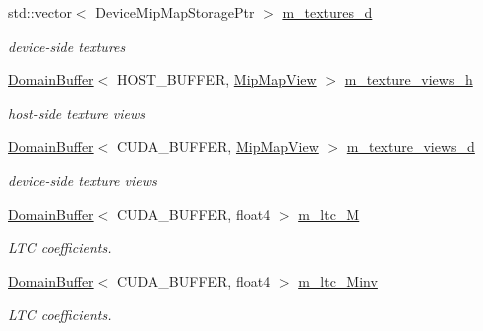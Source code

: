 \begin{DoxyCompactItemize}
std\+::vector$<$ Device\+Mip\+Map\+Storage\+Ptr $>$ \hyperlink{struct_renderer_a011679da0b623ca4300b66df88156361}{m\+\_\+textures\+\_\+d}
\begin{DoxyCompactList}\small\item\em device-\/side textures \end{DoxyCompactList}\item 
\mbox{\label{struct_renderer_a8881860168e01a2c02e42beec853581b}} 
\hyperlink{class_domain_buffer}{Domain\+Buffer}$<$ H\+O\+S\+T\+\_\+\+B\+U\+F\+F\+ER, \hyperlink{struct_mip_map_view}{Mip\+Map\+View} $>$ \hyperlink{struct_renderer_a8881860168e01a2c02e42beec853581b}{m\+\_\+texture\+\_\+views\+\_\+h}
\begin{DoxyCompactList}\small\item\em host-\/side texture views \end{DoxyCompactList}\item 
\mbox{\label{struct_renderer_a50109e103180c6d6201c3ab227fbb3c5}} 
\hyperlink{class_domain_buffer}{Domain\+Buffer}$<$ C\+U\+D\+A\+\_\+\+B\+U\+F\+F\+ER, \hyperlink{struct_mip_map_view}{Mip\+Map\+View} $>$ \hyperlink{struct_renderer_a50109e103180c6d6201c3ab227fbb3c5}{m\+\_\+texture\+\_\+views\+\_\+d}
\begin{DoxyCompactList}\small\item\em device-\/side texture views \end{DoxyCompactList}\item 
\mbox{\label{struct_renderer_ae7b0a4daddc36649b0e93b4801e787bb}} 
\hyperlink{class_domain_buffer}{Domain\+Buffer}$<$ C\+U\+D\+A\+\_\+\+B\+U\+F\+F\+ER, float4 $>$ \hyperlink{struct_renderer_ae7b0a4daddc36649b0e93b4801e787bb}{m\+\_\+ltc\+\_\+M}
\begin{DoxyCompactList}\small\item\em L\+TC coefficients. \end{DoxyCompactList}\item 
\mbox{\label{struct_renderer_a097b611aa8f418c9d75ff867d37d498c}} 
\hyperlink{class_domain_buffer}{Domain\+Buffer}$<$ C\+U\+D\+A\+\_\+\+B\+U\+F\+F\+ER, float4 $>$ \hyperlink{struct_renderer_a097b611aa8f418c9d75ff867d37d498c}{m\+\_\+ltc\+\_\+\+Minv}
\begin{DoxyCompactList}\small\item\em L\+TC coefficients. \end{DoxyCompactList}\item 

\end{DoxyCompactItemize}
